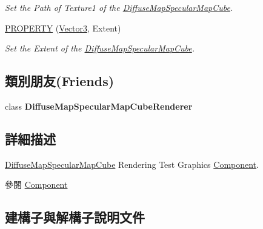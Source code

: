 \begin{DoxyCompactItemize}
\begin{DoxyCompactList}\small\item\em Set the Path of Texture1 of the \hyperlink{class_i_dream_sky_1_1_diffuse_map_specular_map_cube}{Diffuse\+Map\+Specular\+Map\+Cube}. \end{DoxyCompactList}\item 
\hyperlink{class_i_dream_sky_1_1_diffuse_map_specular_map_cube_a10fd436452c4f085fecac9414dd10623}{P\+R\+O\+P\+E\+R\+TY} (\hyperlink{class_i_dream_sky_1_1_vector3}{Vector3}, Extent)
\begin{DoxyCompactList}\small\item\em Set the Extent of the \hyperlink{class_i_dream_sky_1_1_diffuse_map_specular_map_cube}{Diffuse\+Map\+Specular\+Map\+Cube}. \end{DoxyCompactList}\end{DoxyCompactItemize}
\subsection*{類別朋友(Friends)}
\begin{DoxyCompactItemize}
\item 
class {\bfseries Diffuse\+Map\+Specular\+Map\+Cube\+Renderer}\hypertarget{class_i_dream_sky_1_1_diffuse_map_specular_map_cube_a420645eea9386d7539d2f8ae059e75c3}{}\label{class_i_dream_sky_1_1_diffuse_map_specular_map_cube_a420645eea9386d7539d2f8ae059e75c3}

\end{DoxyCompactItemize}


\subsection{詳細描述}
\hyperlink{class_i_dream_sky_1_1_diffuse_map_specular_map_cube}{Diffuse\+Map\+Specular\+Map\+Cube} Rendering Test Graphics \hyperlink{class_i_dream_sky_1_1_component}{Component}. 

\begin{DoxySeeAlso}{參閱}
\hyperlink{class_i_dream_sky_1_1_component}{Component} 
\end{DoxySeeAlso}


\subsection{建構子與解構子說明文件}
